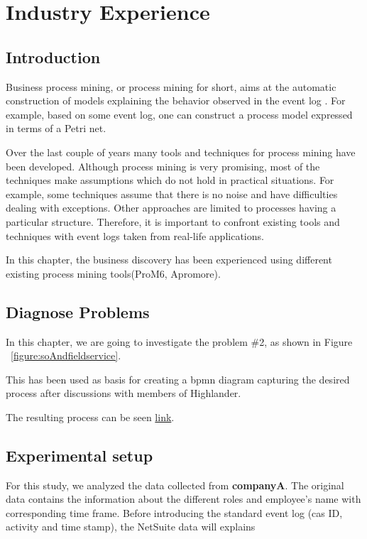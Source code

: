 
\chapter{Industry Experience}
\label{chap:industryExperience}

\section{Introduction}
\label{sec:industryExperience-Introduction}

Business process mining, or process mining for short, aims at the automatic construction of models explaining the behavior observed in the event log \cite{maita2015process}. For example, based on some event log, one can construct a process model expressed in terms of a Petri net.

Over the last couple of years many tools and techniques for process mining have been developed\cite{rozinat2006decision}. Although process mining is very promising, most of the techniques make assumptions which do not hold in practical situations. For example, some techniques assume that there is no noise and have difficulties dealing with exceptions. Other approaches are limited to processes having a particular structure. Therefore, it is important to confront existing tools and techniques with event logs taken from real-life applications.

In this chapter, the business discovery has been experienced using different existing process mining tools(ProM6, Apromore).

\section{Diagnose Problems}

In this chapter, we are going to investigate the problem \#2, as shown in Figure ~\ref{figure:soAndfieldservice}.

This has been used as basis for creating a bpmn diagram capturing the desired process after discussions with members of Highlander.

The resulting process can be seen \href{https://raw.githubusercontent.com/kangqiwang/bpmResearch/main/transaction.png}{link}.


\section{Experimental setup}
\label{sec:industryExperience-Methodology}
For this study, we analyzed the data collected from  \textbf{companyA}. 
The original data contains the information about the different roles and employee's name with corresponding time frame. Before introducing the  standard event log (cas ID, activity and time stamp), the NetSuite data will explains


